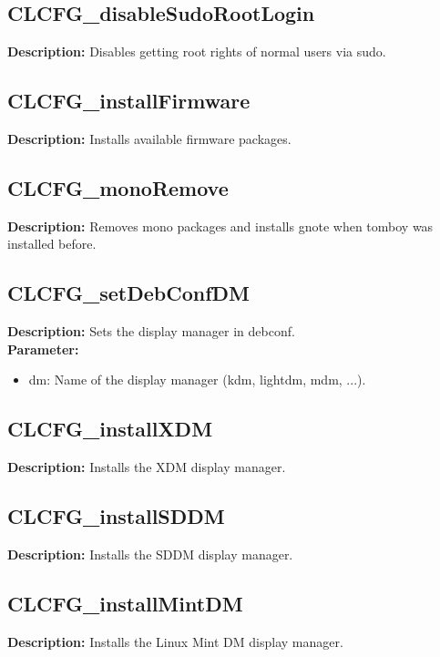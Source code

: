 \subsection{CLCFG\_disableSudoRootLogin}
\textbf{Description:} Disables getting root rights of normal users via sudo.\\

\subsection{CLCFG\_installFirmware}
\textbf{Description:} Installs available firmware packages.\\

\subsection{CLCFG\_monoRemove}
\textbf{Description:} Removes mono packages and installs gnote when tomboy was installed before.\\

\subsection{CLCFG\_setDebConfDM}
\textbf{Description:} Sets the display manager in debconf.\\
\textbf{Parameter:}
\begin{itemize}
\item dm: Name of the display manager (kdm, lightdm, mdm, ...).
\end{itemize}

\subsection{CLCFG\_installXDM}
\textbf{Description:} Installs the XDM display manager.\\

\subsection{CLCFG\_installSDDM}
\textbf{Description:} Installs the SDDM display manager.\\

\subsection{CLCFG\_installMintDM}
\textbf{Description:} Installs the Linux Mint DM display manager.\\


